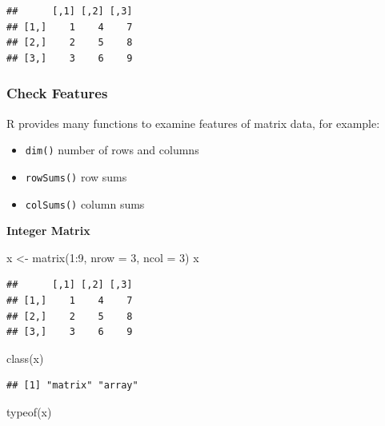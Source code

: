 \documentclass[
]{article}
\newenvironment{Shaded}{\begin{snugshade}}{\end{snugshade}}
\newcommand{\AttributeTok}[1]{\textcolor[rgb]{0.77,0.63,0.00}{#1}}
\newcommand{\DecValTok}[1]{\textcolor[rgb]{0.00,0.00,0.81}{#1}}
\newcommand{\FunctionTok}[1]{\textcolor[rgb]{0.00,0.00,0.00}{#1}}
\newcommand{\NormalTok}[1]{#1}
\newcommand{\OtherTok}[1]{\textcolor[rgb]{0.56,0.35,0.01}{#1}}
\newcommand{\SpecialCharTok}[1]{\textcolor[rgb]{0.00,0.00,0.00}{#1}}
\providecommand{\tightlist}{%
  \setlength{\itemsep}{0pt}\setlength{\parskip}{0pt}}
\begin{document}
\begin{verbatim}
##      [,1] [,2] [,3]
## [1,]    1    4    7
## [2,]    2    5    8
## [3,]    3    6    9
\end{verbatim}

\hypertarget{check-features-1}{%
\subsubsection{Check Features}\label{check-features-1}}

R provides many functions to examine features of matrix data, for example:

\begin{itemize}
\tightlist
\item
  \texttt{dim()} number of rows and columns
\item
  \texttt{rowSums()} row sums
\item
  \texttt{colSums()} column sums
\end{itemize}

\textbf{Integer Matrix}

\begin{Shaded}
\begin{Highlighting}[]
\NormalTok{x }\OtherTok{\textless{}{-}} \FunctionTok{matrix}\NormalTok{(}\DecValTok{1}\SpecialCharTok{:}\DecValTok{9}\NormalTok{, }\AttributeTok{nrow =} \DecValTok{3}\NormalTok{, }\AttributeTok{ncol =} \DecValTok{3}\NormalTok{)}
\NormalTok{x}
\end{Highlighting}
\end{Shaded}

\begin{verbatim}
##      [,1] [,2] [,3]
## [1,]    1    4    7
## [2,]    2    5    8
## [3,]    3    6    9
\end{verbatim}

\begin{Shaded}
\begin{Highlighting}[]
\FunctionTok{class}\NormalTok{(x)}
\end{Highlighting}
\end{Shaded}

\begin{verbatim}
## [1] "matrix" "array"
\end{verbatim}

\begin{Shaded}
\begin{Highlighting}[]
\FunctionTok{typeof}\NormalTok{(x)}
\end{Highlighting}
\end{Shaded}
\end{document}
